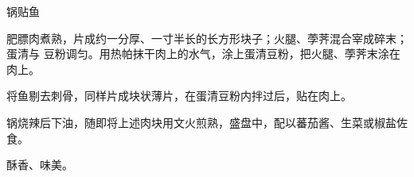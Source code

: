 \begin{recipe}{锅贴鱼}

\ingredients


\cooking

肥膘肉煮熟，片成约一分厚、一寸半长的长方形块子；火腿、荸荠混合宰成碎末；蛋清与
豆粉调匀。用热帕抹干肉上的水气，涂上蛋清豆粉，把火腿、荸荠末涂在肉上。

将鱼剔去刺骨，同样片成块状薄片，在蛋清豆粉内拌过后，贴在肉上。

锅烧辣后下油，随即将上述肉块用文火煎熟，盛盘中，配以蕃茄酱、生菜或椒盐佐食。

\notes

酥香、味美。

\end{recipe}

